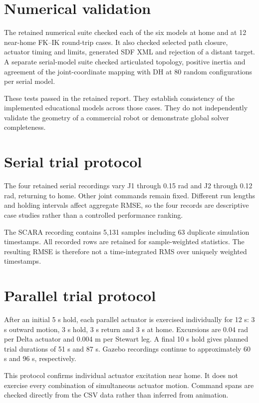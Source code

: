 \documentclass[11pt,a4paper,oneside]{report}
\begin{document}
\section{Numerical validation}
The retained numerical suite checked each of the six models at home and at 12 near-home FK--IK round-trip cases. It also checked selected path closure, actuator timing and limits, generated SDF XML and rejection of a distant target. A separate serial-model suite checked articulated topology, positive inertia and agreement of the joint-coordinate mapping with DH at 80 random configurations per serial model.

These tests passed in the retained report. They establish consistency of the implemented educational models across those cases. They do not independently validate the geometry of a commercial robot or demonstrate global solver completeness.

\section{Serial trial protocol}
The four retained serial recordings vary J1 through 0.15 rad and J2 through 0.12 rad, returning to home. Other joint commands remain fixed. Different run lengths and holding intervals affect aggregate RMSE, so the four records are descriptive case studies rather than a controlled performance ranking.

The SCARA recording contains 5,131 samples including 63 duplicate simulation timestamps. All recorded rows are retained for sample-weighted statistics. The resulting RMSE is therefore not a time-integrated RMS over uniquely weighted timestamps.

\section{Parallel trial protocol}
After an initial 5 s hold, each parallel actuator is exercised individually for 12 s: 3 s outward motion, 3 s hold, 3 s return and 3 s at home. Excursions are 0.04 rad per Delta actuator and 0.004 m per Stewart leg. A final 10 s hold gives planned trial durations of 51 s and 87 s. Gazebo recordings continue to approximately 60 s and 96 s, respectively.

This protocol confirms individual actuator excitation near home. It does not exercise every combination of simultaneous actuator motion. Command spans are checked directly from the CSV data rather than inferred from animation.
\end{document}
